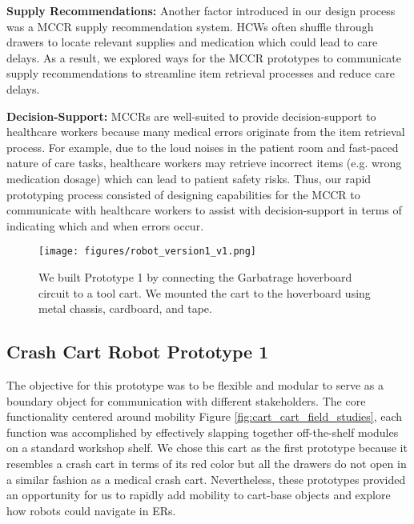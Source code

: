 \textbf{Supply Recommendations:} Another factor introduced in our design process was a MCCR supply recommendation system. 
HCWs often shuffle through drawers to locate relevant supplies and medication which could lead to care delays. 
As a result, we explored ways for the MCCR prototypes to communicate supply recommendations to streamline item retrieval processes and reduce care delays.

\textbf{Decision-Support:} MCCRs are well-suited to provide decision-support to healthcare workers because many medical errors originate from the item retrieval process. 
For example, due to the loud noises in the patient room and fast-paced nature of care tasks, healthcare workers may retrieve incorrect items (e.g. wrong medication dosage) which can lead to patient safety risks. 
Thus, our rapid prototyping process consisted of designing capabilities for the MCCR to communicate with healthcare workers to assist with decision-support in terms of indicating which and when errors occur. 


 \begin{figure}[t] 
	\centering 
	\texttt{[image: figures/robot\_version1\_v1.png]} 
	\caption{We built Prototype 1 by connecting the Garbatrage hoverboard circuit \cite{mandel2023recapturing} to a tool cart. We mounted the cart to the hoverboard using metal chassis, cardboard, and tape.} 
	\label{fig:robot_version1} 
\end{figure}

\subsection{Crash Cart Robot Prototype 1}

The objective for this prototype was to be flexible and modular to serve as a boundary object for communication with different stakeholders. 
The core functionality centered around mobility Figure \ref{fig:cart_cart_field_studies}, each function was accomplished by effectively slapping together off-the-shelf modules on a standard workshop shelf.
We chose this cart as the first prototype because it resembles a crash cart in terms of its red color but all the drawers do not open in a similar fashion as a medical crash cart.
Nevertheless, these prototypes provided an opportunity for us to rapidly add mobility to cart-base objects and explore how robots could navigate in ERs.

